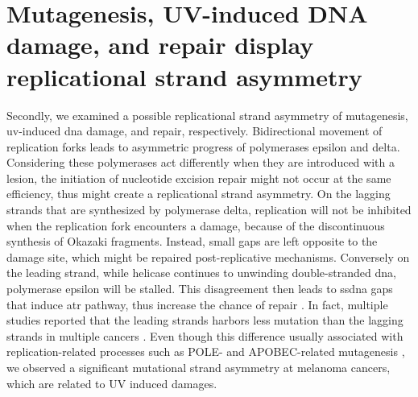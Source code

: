 \section{Mutagenesis, UV-induced DNA damage, and repair display replicational strand asymmetry}

Secondly, we examined a possible replicational strand asymmetry of mutagenesis, \gls{uv}-induced \gls{dna} damage, and repair, respectively. Bidirectional movement of replication forks leads to asymmetric progress of polymerases \gls{epsilon} and \gls{delta}. Considering these polymerases act differently when they are introduced with a lesion, the initiation of nucleotide excision repair might not occur at the same efficiency, thus might create a replicational strand asymmetry. On the lagging strands that are synthesized by polymerase \gls{delta}, replication will not be inhibited when the replication fork encounters a damage, because of the discontinuous synthesis of Okazaki fragments. Instead, small gaps are left opposite to the damage site, which might be repaired post-replicative mechanisms. Conversely on the leading strand, while helicase continues to unwinding double-stranded \gls{dna}, polymerase \gls{epsilon} will be stalled. This disagreement then leads to \gls{ssdna} gaps that induce \gls{atr} pathway, thus increase the chance of repair \citep{byun2005functional}. In fact, multiple studies reported that the leading strands harbors less mutation than the lagging strands in multiple cancers \citep{haradhvala2016mutational,lujan2012mismatch,reijns2015lagging,shinbrot2014exonuclease}. Even though this difference usually associated with replication-related processes such as POLE- and APOBEC-related mutagenesis \citep{haradhvala2016mutational}, we observed a significant mutational strand asymmetry at melanoma cancers, which are related to UV induced damages. 

